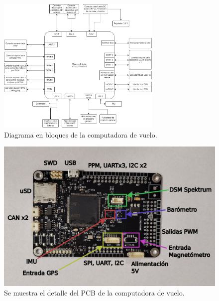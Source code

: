 \begin{figure}[htb]
    \centering
    \includegraphics[width=0.7\textwidth]{img/diagrama_en_bloques_computadora_de_vuelo.png}
    \caption{Diagrama en bloques de la computadora de vuelo.}
    \label{fig:diagrama_en_bloques_computadora_de_vuelo}
\end{figure}

\begin{figure}[htb]
    \centering
    \includegraphics[width=\textwidth]{img/chori_detalle.png}
    \caption{Se muestra el detalle del PCB de la computadora de vuelo.}
    \label{fig:chori_detalle}    
\end{figure}


